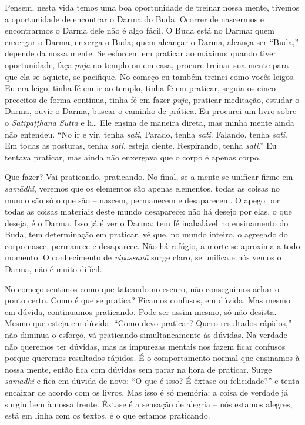 Pensem, nesta vida temos uma boa oportunidade de treinar nossa
mente, tivemos a oportunidade de encontrar o Darma do Buda. Ocorrer de
nascermos e encontrarmos o Darma dele não é algo fácil. O Buda está no
Darma: quem enxergar o Darma, enxerga o Buda; quem alcançar o Darma,
alcança ser “Buda,” depende da nossa mente. Se esforcem em praticar ao
máximo: quando tiver oportunidade, faça \textit{pūja} no templo ou em
casa, procure treinar sua mente para que ela se aquiete, se pacifique.
No começo eu também treinei como vocês leigos. Eu era leigo, tinha fé
em ir ao templo, tinha fé em praticar, seguia os cinco preceitos de
forma contínua, tinha fé em fazer \textit{pūja}, praticar meditação,
estudar o Darma, ouvir o Darma, buscar o caminho de prática. Eu
procurei um livro sobre o \textit{Satipaṭṭhāna Sutta} e li… Ele
ensina de maneira direta, mas minha mente ainda não entendeu. “No ir e
vir, tenha \textit{sati}. Parado, tenha \textit{sati}. Falando, tenha
\textit{sati}. Em todas as posturas, tenha \textit{sati}, esteja
ciente. Respirando, tenha \textit{sati}.” Eu tentava praticar, mas
ainda não enxergava que o corpo é apenas corpo. 

Que fazer? Vai praticando, praticando. No final, se a mente se
unificar firme em \textit{samādhi}, veremos que os elementos são
apenas elementos, todas as coisas no mundo são só o que são – nascem,
permanecem e desaparecem. O apego por todas as coisas materiais deste
mundo desaparece: não há desejo por elas, o que deseja, é o Darma. Isso
já é ver o Darma: tem fé inabalável no ensinamento do Buda, tem
determinação em praticar, vê que, no mundo inteiro, o agregado do corpo
nasce, permanece e desaparece. Não há refúgio, a morte se aproxima a
todo momento. O conhecimento de \textit{vipassanā} surge claro, se
unifica e nós vemos o Darma, não é muito difícil. 

No começo sentimos como que tateando no escuro, não conseguimos
achar o ponto certo. Como é que se pratica? Ficamos confusos, em
dúvida. Mas mesmo em dúvida, continuamos praticando. Pode ser assim
mesmo, só não desista. Mesmo que esteja em dúvida: “Como devo praticar?
Quero resultados rápidos,” não diminua o esforço, vá praticando
simultaneamente às dúvidas. Na verdade não queremos ter dúvidas, mas as
impurezas mentais nos fazem ficar confusos porque queremos resultados
rápidos. É o comportamento normal que ensinamos à nossa mente, então
fica com dúvidas sem parar na hora de praticar. Surge
\textit{samādhi} e fica em dúvida de novo: “O que é isso? É êxtase ou
felicidade?” e tenta encaixar de acordo com os livros. Mas isso é só
memória: a coisa de verdade já surgiu bem à nossa frente. Êxtase é a
sensação de alegria – nós estamos alegres, está em linha com os textos,
é o que estamos praticando. 

